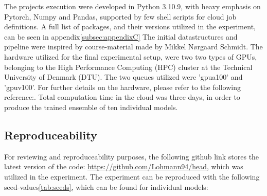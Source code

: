 The projects execution were developed in Python 3.10.9, with heavy emphasis on Pytorch, Numpy and Pandas,
supported by few shell scripts for cloud job definitions.
A full list of packages, and their versions utilized in the experiment, can be seen in appendix\ref{subsec:appendixC}
The initial datastructures and pipeline were inspired by course-material made by Mikkel Nørgaard Schmidt.
The hardware utilized for the final experimental setup, were two two types of GPUs, belonging
to the High Performance Computing (HPC) cluster at the Technical University of Denmark (DTU).
The two queues utilized were 'gpua100' and 'gpuv100'. For further details on the hardware,
please refer to the following reference:\cite{hpc}. Total computation time in the cloud was three days,
in order to produce the trained ensemble of ten individual models.

\subsection{Reproduceability}\label{subsec:reproduceability}

For reviewing and reproduceability purposes,
the following github link stores the latest version of the code: \url{https://github.com/Lohmann94/head},
which was utilized in the experiment. The experiment can be reproduced with the following seed-values\ref{tab:seeds},
which can be found for individual models:

